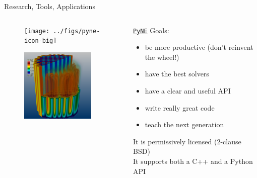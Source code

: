 \documentclass[xcolor=x11names,compress]{beamer}
\renewcommand{\(}{\begin{columns}}
\renewcommand{\)}{\end{columns}}
\newcommand{\<}[1]{\begin{column}{#1}}
\renewcommand{\>}{\end{column}}
\begin{document}
\begin{frame}{Research, Tools, Applications}

    \begin{columns}
    \begin{column}{0.45\textwidth}
       \begin{center}
 	   \begin{figure}
       \texttt{[image: ../figs/pyne-icon-big]}
	   \end{figure}
 	   \end{center}
       \begin{center}
 	   \begin{figure}
       \includegraphics[height=3.5cm]{../figs/denovo-pwr}
	   \end{figure}
 	   \end{center}
 	\end{column}
 	\begin{column}{0.45\textwidth}
 	\href{http://pyne.io/}{\texttt{PyNE}} Goals:
       \begin{itemize}
       \item be more \alert{productive} (don't reinvent the wheel!)
       \item have the \alert{best solvers}
       \item have a clear and useful API
       \item write really \alert{great code}
       \item \alert{teach} the next generation
       \end{itemize}
    It is permissively licensed (2-clause BSD)\\
    \vspace{0.5 em}
    It supports both a \alert{C++} and a \textcolor{dgreen}{Python} API
  	\end{column}
	\end{columns}

\end{frame}

%	
%	
\end{document}
